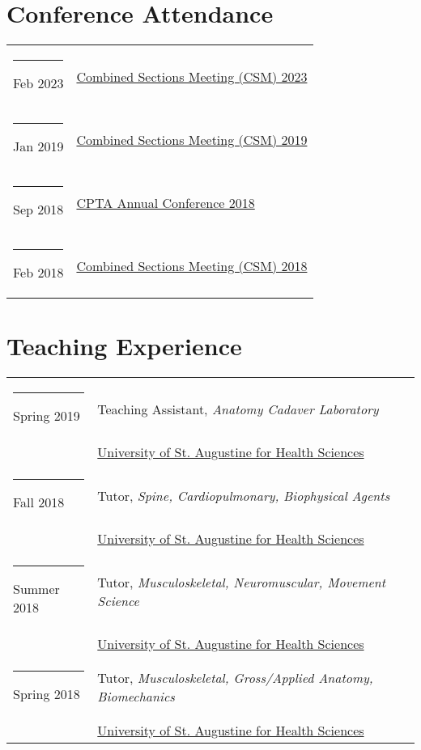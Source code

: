 \documentclass[margin,line]{res}
\begin{document}
\begin{resume}
\section{\sc Conference Attendance}
\begin{longtable}{@{}p{0.7in}p{4in}}\rule{-1mm}{4.5mm}
\hspace*{-4mm} Feb 2023 & \href{http://www.apta.org/CSM/}{Combined Sections Meeting (CSM) 2023}\\
\hspace*{-4mm} \rule{-1mm}{5mm} Jan 2019 & \href{http://www.apta.org/CSM/}{Combined Sections Meeting (CSM) 2019}\\
\hspace*{-4mm} \rule{-1mm}{5mm} Sep 2018 & \href{https://www.ccapta.org/m/event_details.asp?id=986302}{CPTA Annual Conference 2018}\\
\hspace*{-4mm} \rule{-1mm}{5mm} Feb 2018 & \href{http://www.apta.org/CSM/}{Combined Sections Meeting (CSM) 2018}\\
\end{longtable}

\section{\sc Teaching Experience}
\begin{longtable}{@{}p{0.7in}p{4in}}\rule{-1mm}{4.5mm}
\hspace*{-4mm} Spring 2019 & Teaching Assistant, \textit{Anatomy Cadaver Laboratory}\\*
\hspace*{-4mm} & \hspace{4mm} \href{https://www.usa.edu/}{University of St. Augustine for Health Sciences}\\
\hspace*{-4mm} \rule{-1mm}{5mm} Fall 2018 & Tutor, \textit{Spine, Cardiopulmonary, Biophysical Agents}\\*
\hspace*{-4mm} & \hspace{4mm} \href{https://www.usa.edu/}{University of St. Augustine for Health Sciences}\\
\hspace*{-4mm} \rule{-1mm}{5mm} Summer 2018 & Tutor, \textit{Musculoskeletal, Neuromuscular, Movement Science}\\*
\hspace*{-4mm} & \hspace{4mm} \href{https://www.usa.edu/}{University of St. Augustine for Health Sciences}\\
\hspace*{-4mm} \rule{-1mm}{5mm} Spring 2018 & Tutor, \textit{Musculoskeletal, Gross/Applied Anatomy, Biomechanics}\\*
\hspace*{-4mm} & \hspace{4mm} \href{https://www.usa.edu/}{University of St. Augustine for Health Sciences}\\
\end{longtable}


\end{resume}
\end{document}
